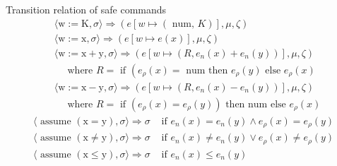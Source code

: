 \documentclass[aspectratio=169]{beamer}
\begin{document}
\begin{frame}{Transition relation of safe commands}
  $$
    \begin{aligned}
       & \langle\mathrm{w}:=\mathrm{K}, \sigma\rangle \Rightarrow(e[w \mapsto(\text { num, } K)], \mu, \zeta)                                             \\
       & \langle\mathrm{w}:=\mathrm{x}, \sigma\rangle \Rightarrow(e[w \mapsto e(x)], \mu, \zeta)                                                          \\
       & \langle\mathrm{w}:=\mathrm{x}+\mathrm{y}, \sigma\rangle \Rightarrow\left(e\left[w \mapsto\left(R, e_n(x)+e_n(y)\right)\right], \mu, \zeta\right) \\
       & \quad \text { where } R=\text { if }\left(e_\rho(x)=\text { num then } e_\rho(y) \text { else } e_\rho(x)\right.                                 \\
       & \langle\mathrm{w}:=\mathrm{x}-\mathrm{y}, \sigma\rangle \Rightarrow\left(e\left[w \mapsto\left(R, e_n(x)-e_n(y)\right)\right], \mu, \zeta\right) \\
       & \quad \text { where } R=\text { if }\left(e_\rho(x)=e_\rho(y)\right) \text { then num else } e_\rho(x)
    \end{aligned}
  $$
  $$
    \begin{array}{lr}
      \langle\text { assume }(\mathrm{x}=\mathrm{y}), \sigma\rangle \Rightarrow \sigma      & \text { if } e_n(x)=e_n(y) \wedge e_\rho(x)=e_\rho(y)         \\
      \langle\text { assume }(\mathrm{x} \neq \mathrm{y}), \sigma\rangle \Rightarrow \sigma & \text { if } e_n(x) \neq e_n(y) \vee e_\rho(x) \neq e_\rho(y) \\
      \langle\text { assume }(\mathrm{x} \leq \mathrm{y}), \sigma\rangle \Rightarrow \sigma & \text { if } e_n(x) \leq e_n(y)
    \end{array}
  $$
\end{frame}
\end{document}
